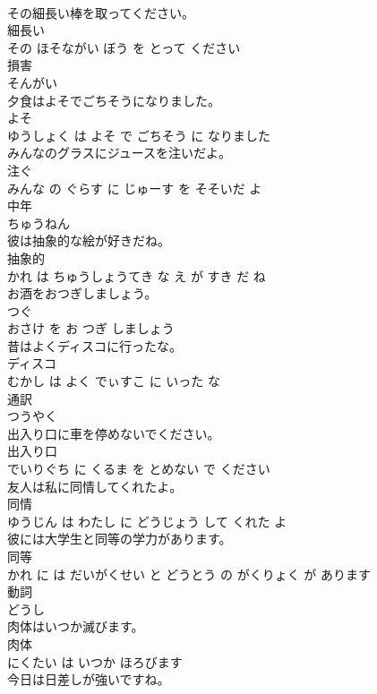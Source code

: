 \documentclass[8pt]{extreport}
\begin{document}
\begin{CJK}{UTF8}{min}
\\	その細長い棒を取ってください。	
\\	細長い 
\\	その ほそながい ぼう を とって ください			
\\	損害	
\\	そんがい			
\\	夕食はよそでごちそうになりました。	
\\	よそ 
\\	ゆうしょく は よそ で ごちそう に なりました			
\\	みんなのグラスにジュースを注いだよ。	
\\	注ぐ 
\\	みんな の ぐらす に じゅーす を そそいだ よ			
\\	中年	
\\	ちゅうねん			
\\	彼は抽象的な絵が好きだね。	
\\	抽象的 
\\	かれ は ちゅうしょうてき な え が すき だ ね			
\\	お酒をおつぎしましょう。	
\\	つぐ 
\\	おさけ を お つぎ しましょう			
\\	昔はよくディスコに行ったな。	
\\	ディスコ 
\\	むかし は よく でぃすこ に いった な			
\\	通訳	
\\	つうやく			
\\	出入り口に車を停めないでください。	
\\	出入り口 
\\	でいりぐち に くるま を とめない で ください			
\\	友人は私に同情してくれたよ。	
\\	同情 
\\	ゆうじん は わたし に どうじょう して くれた よ			
\\	彼には大学生と同等の学力があります。	
\\	同等 
\\	かれ に は だいがくせい と どうとう の がくりょく が あります			
\\	動詞	
\\	どうし			
\\	肉体はいつか滅びます。	
\\	肉体 
\\	にくたい は いつか ほろびます			
\\	今日は日差しが強いですね。	

\end{CJK}
\end{document}
